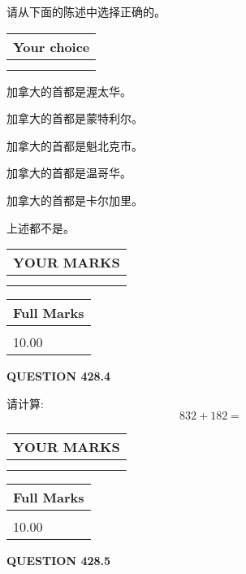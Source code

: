 \documentclass{ctexart}
\begin{document}
  
请从下面的陈述中选择正确的。
  
  
\noindent\hspace{3.0in} \begin{tabular}{|l|}
\hline
Your choice \\
\hline
 \\ 
 \\ 
\hline
\end{tabular}
  
  
 
 
加拿大的首都是渥太华。
 
 
加拿大的首都是蒙特利尔。
 
 
加拿大的首都是魁北克市。
 
 
加拿大的首都是温哥华。
 
 
加拿大的首都是卡尔加里。
 
 
 上述都不是。
 
 
  
\vspace{0.2in}
  
\noindent\begin{tabular}{|l|}
\hline
 YOUR MARKS  \\
\hline
 \\ 
 \\ 
\hline
\end{tabular}
\hspace{0.05in} \begin{tabular}{|l|}
\hline
 Full Marks  \\
\hline
 \\ 
10.00 \\
\hline
\end{tabular}
{\textbf{\Large{QUESTION
428.4 
}}}
  
  
 
请计算:
\begin{equation}
832 +  %
182 = \nonumber
\end{equation}
 

 

 
  
\vspace{0.2in}
  
\noindent\begin{tabular}{|l|}
\hline
 YOUR MARKS  \\
\hline
 \\ 
 \\ 
\hline
\end{tabular}
\hspace{0.05in} \begin{tabular}{|l|}
\hline
 Full Marks  \\
\hline
 \\ 
10.00 \\
\hline
\end{tabular}
{\textbf{\Large{QUESTION
428.5 
}}}
  
\end{document}
